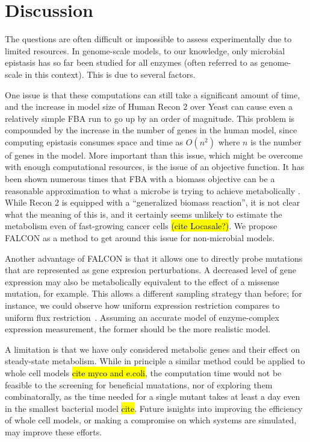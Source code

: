 \section{Discussion}

The questions are often
difficult or impossible to assess experimentally due to limited
resources.  In genome-scale models, to our knowledge, only microbial
epistasis has so far been studied for all enzymes (often referred to
as genome-scale in this context). This is due to several factors.

One issue is that these computations can still take a significant
amount of time, and the increase in model size of Human Recon 2 over
Yeast can cause even a relatively simple FBA run to go up by an order
of magnitude.  This problem is compounded by the increase in the
number of genes in the human model, since computing epistasis consumes
space and time as $O(n^2)$ where $n$ is the number of genes in the
model. More important than this issue, which might be overcome with
enough computational resources, is the issue of an objective
function. It has been shown numerous times that FBA with a biomass
objective can be a reasonable approximation to what a microbe is
trying to achieve metabolically
\citep{Schuetz2012, Fong2004, Varma1994}. While Recon 2
is equipped with a ``generalized biomass reaction'', it is not clear
what the meaning of this is, and it certainly seems unlikely to
estimate the metabolism even of fast-growing cancer cells \hl{(cite
  Locasale?)}. We propose FALCON as a method to get around this issue
for non-microbial models.

Another advantage of FALCON is that it allows one to directly probe
mutations that are represented as gene expresion perturbations. A
decreased level of gene expression may also be metabolically
equivalent to the effect of a missense mutation, for example. This
allows a different sampling strategy than before; for instance, we
could observe how uniform expression restriction compares to uniform
flux restriction~\citep{Xu2012}. Assuming an accurate model of
enzyme-complex expression measurement, the former should be the more
realistic model.

A limitation is that we have only considered metabolic genes and their
effect on steady-state metabolism. While in principle a similar method
could be applied to whole cell models \hl{cite myco and e.coli}, the
computation time would not be feasible to the screening for beneficial
muatations, nor of exploring them combinatorally, as the time needed
for a single mutant takes at least a day even in the smallest
bacterial model \hl{cite}. Future isnights into improving the
efficiency of whole cell models, or making a compromise on which
systems are simulated, may improve these efforts.

